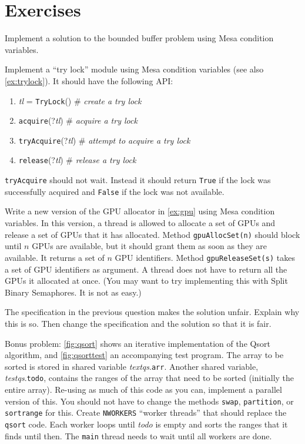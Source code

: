 \documentclass{report}
\begin{document}
\section*{Exercises}
\begin{problems}
\item \label{ex:bbmesa} Implement a solution to the bounded buffer problem using Mesa condition
variables.
\item Implement a ``try lock'' module using Mesa condition variables
(see also \autoref{ex:trylock}).  It should
have the following API:
\begin{enumerate}
\item \textit{tl} = \texttt{TryLock}() \# \emph{create a try lock}
\item \texttt{acquire}(?\textit{tl}) \# \emph{acquire a try lock}
\item \texttt{tryAcquire}(?\textit{tl}) \# \emph{attempt to acquire a try lock}
\item \texttt{release}(?\textit{tl}) \# \emph{release a try lock}
\end{enumerate}
\noindent
\texttt{tryAcquire} should not wait.
Instead it should return \texttt{True} if the lock was successfully
acquired and \texttt{False} if the lock was not available.
\item Write a new version of the GPU allocator in \autoref{ex:gpu}
using Mesa condition variables.
In this version,
a thread is allowed to allocate a set of GPUs and release a set of GPUs that it
has allocated.  Method \texttt{gpuAllocSet(n)} should block until $n$ GPUs are
available, but it should grant them as soon as they are available.
It returns a set of $n$ GPU identifiers.
Method \texttt{gpuReleaseSet(s)} takes a set of GPU identifiers as argument.
A thread does not have to return all the GPUs it allocated at once.
(You may want to try implementing this with Split Binary Semaphores.  It is not as easy.)
\item The specification in the previous question makes the solution unfair.
Explain why this is so.  Then change the specification and the solution so that
it is fair.
\item \label{ex:qsort}
Bonus problem: \autoref{fig:qsort} shows an iterative implementation of the Qsort
algorithm, and \autoref{fig:qsorttest} an accompanying test program.
The array to be sorted is stored in shared variable \textit{textqs}.\texttt{arr}.
Another shared variable, \textit{testqs}.\texttt{todo}, contains the ranges of the
array that need to be sorted (initially the entire array).
Re-using as much of this code as you can, implement a parallel version of
this.  You should not have to change the methods \texttt{swap}, \texttt{partition},
or \texttt{sortrange} for this.  Create \texttt{NWORKERS} ``worker threads''
that should replace the \texttt{qsort} code.
Each worker loops until \textit{todo}
is empty and sorts the ranges that it finds until then.  The \texttt{main}
thread needs to wait until all workers are done.
\end{problems}
\end{document}
